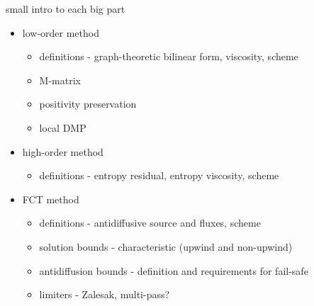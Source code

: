 
small intro to each big part

\begin{itemize}
\item low-order method
  \begin{itemize}
    \item definitions - graph-theoretic bilinear form, viscosity, scheme
    \item M-matrix
    \item positivity preservation
    \item local DMP
  \end{itemize}
\item high-order method
  \begin{itemize}
    \item definitions - entropy residual, entropy viscosity, scheme
  \end{itemize}
\item FCT method
  \begin{itemize}
    \item definitions - antidiffusive source and fluxes, scheme
    \item solution bounds - characteristic (upwind and non-upwind)
    \item antidiffusion bounds - definition and requirements for fail-safe
    \item limiters - Zalesak, multi-pass?
  \end{itemize}
\end{itemize}
